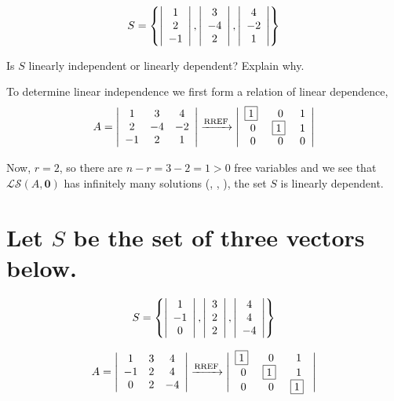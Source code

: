\documentclass{article}
\begin{document}
\[
S= \left\{ \left| \begin{array}{c} 1 \\ 2 \\ -1 \\ \end{array} \right| , \left| \begin{array}{c} 3 \\ -4 \\ 2 \\ \end{array} \right| , \left| \begin{array}{c} 4 \\ -2 \\ 1 \\ \end{array} \right| \right\}
\]

Is \(S\) linearly independent or linearly dependent? Explain why.

\bigskip

\sol

To determine linear independence we first form a relation of linear dependence,
\begin{equation}
  A =
  \left|
  \begin{array}{cccc}
    1 & 3 & 4 \\
    2 & -4 & -2 \\
    -1 & 2 & 1 \\
  \end{array}
  \right|
  \xrightarrow[]{\text{RREF}}
  \left|
  \begin{array}{cccc}
    $\boxed{1}$~ & 0 & 1 \\
    0 & $\boxed{1}$~ & 1 \\
    0 & 0 & 0 \\
  \end{array}
  \right|
\end{equation}

Now, \(r=2\), so there are \(n-r=3-2=1 > 0\) free variables and we see that \(\mathcal{LS}(A,\textbf{0})\) has infinitely many solutions (\LIVHS, \FVCS, \HSC), the set \(S\) is linearly dependent.

\section{Let \(S\) be the set of three vectors below.}

\[
S= \left\{ \left| \begin{array}{c} 1 \\ -1 \\ 0 \\ \end{array} \right| , \left| \begin{array}{c} 3 \\ 2 \\ 2 \\ \end{array} \right| , \left| \begin{array}{c} 4 \\ 4 \\ -4 \\ \end{array} \right| \right\}
\]

\begin{equation}
  A =
  \left|
  \begin{array}{cccc}
    1 & 3 & 4 \\
    -1 & 2 & 4 \\
    0 & 2 & -4 \\
  \end{array}
  \right|
  \xrightarrow[]{\text{RREF}}
  \left|
  \begin{array}{cccc}
    $\boxed{1}$~ & 0 & 1 \\
    0 & $\boxed{1}$~ & 1 \\
    0 & 0 & $\boxed{1}$~ \\
  \end{array}
  \right|
\end{equation}
\end{document}
